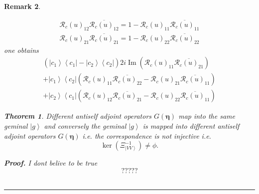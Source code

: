 \documentclass[aps,preprint]{revtex4}%
\newtheorem{theorem}{Theorem}
\newtheorem{remark}[theorem]{Remark}
\newenvironment{proof}[1][Proof]{\noindent\textbf{#1.} }{\ \rule{0.5em}{0.5em}}
\begin{document}
\begin{remark}
\begin{enumerate}
\begin{gather}
\mathcal{R}_{c}\left(  u\right)  _{12}\overline{\mathcal{R}_{c}\left(
u\right)  _{12}}=1-\mathcal{R}_{c}\left(  u\right)  _{11}\overline
{\mathcal{R}_{c}\left(  u\right)  _{11}}\\
\mathcal{R}_{c}\left(  u\right)  _{21}\overline{\mathcal{R}_{c}\left(
u\right)  _{21}}=1-\mathcal{R}_{c}\left(  u\right)  _{22}\overline
{\mathcal{R}_{c}\left(  u\right)  _{22}}%
\end{gather}
one obtains
\begin{gather}
\left(  \overset{}{\left\vert c_{1}\right\rangle \left\langle c_{1}\right\vert
-\left\vert c_{2}\right\rangle \left\langle c_{2}\right\vert }\right)
2i\operatorname{Im}\left(  \mathcal{R}_{c}\left(  u\right)  _{11}%
\overline{\mathcal{R}_{c}\left(  u\right)  _{21}}\right)  \\
+\left\vert c_{1}\right\rangle \left\langle c_{2}\right\vert \left(
\mathcal{R}_{c}\left(  u\right)  _{11}\overline{\mathcal{R}_{c}\left(
u\right)  _{22}}-\mathcal{R}_{c}\left(  u\right)  _{21}\overline
{\mathcal{R}_{c}\left(  u\right)  _{11}}\right)  \\
+\left\vert c_{2}\right\rangle \left\langle c_{1}\right\vert \left(
\mathcal{R}_{c}\left(  u\right)  _{12}\overline{\mathcal{R}_{c}\left(
u\right)  _{21}}-\mathcal{R}_{c}\left(  u\right)  _{22}\overline
{\mathcal{R}_{c}\left(  u\right)  _{11}}\right)
\end{gather}


\begin{theorem}
Different antiself adjoint operators $G\mathbf{\left(  \mathbf{\eta}\right)
}$ map into the same geminal $\left\vert g\right\rangle $ and conversely the
geminal $\left\vert g\right\rangle $ is mapped into different antiself adjoint
operators $G\mathbf{\left(  \mathbf{\eta}\right)  }$ i.e. the correspondence
is not injective i.e.
\begin{equation}
\ker\left(  \mathcal{\Xi}_{\left\vert VV\right\rangle }^{-1}\right)  \neq\phi.
\end{equation}

\end{theorem}

\begin{proof}
I dont belive to be true%
\begin{equation}
?????
\end{equation}
\label{Products of Different Geminals and Pfaffians}\label{06/30/2025}
\end{proof}
\end{enumerate}
\end{remark}
\end{document}
